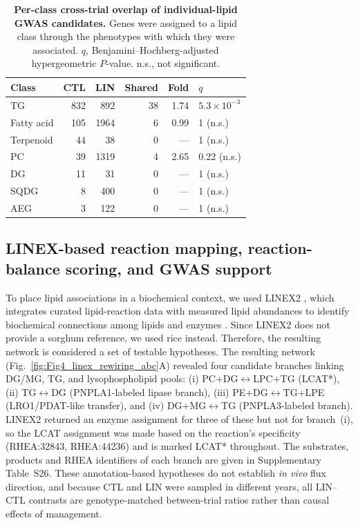 \documentclass[9pt,twocolumn,twoside]{rilabRxiv}
\begin{document}
\begin{table}[!ht]
\centering
\caption{\textbf{Per-class cross-trial overlap of individual-lipid GWAS candidates.} Genes were assigned to a lipid class through the phenotypes with which they were associated. $q$, Benjamini--Hochberg-adjusted hypergeometric $P$-value. n.s., not significant.}
\label{tab:overlap_class}
\small
\begin{tabular}{lrrrrl}
\toprule
\textbf{Class} & \textbf{CTL} & \textbf{LIN} & \textbf{Shared} & \textbf{Fold} & \textbf{$q$} \\
\midrule
TG          & 832 &  892 & 38 & 1.74 & $5.3\times10^{-3}$ \\
Fatty acid  & 105 & 1964 &  6 & 0.99 & 1 (n.s.) \\
Terpenoid   &  44 &   38 &  0 & ---  & 1 (n.s.) \\
PC          &  39 & 1319 &  4 & 2.65 & 0.22 (n.s.) \\
DG          &  11 &   31 &  0 & ---  & 1 (n.s.) \\
SQDG        &   8 &  400 &  0 & ---  & 1 (n.s.) \\
AEG         &   3 &  122 &  0 & ---  & 1 (n.s.) \\
\bottomrule
\end{tabular}
\end{table}

\subsection*{LINEX-based reaction mapping, reaction-balance scoring, and GWAS support}

To place lipid associations in a biochemical context, we used LINEX2 \citep{Rose2023LINEX2}, which integrates curated lipid-reaction data with measured lipid abundances to identify biochemical connections among lipids and enzymes \citep{Morgat2016Rhea}. Since LINEX2 does not provide a sorghum reference, we used rice instead. Therefore, the resulting network is considered a set of testable hypotheses. The resulting network (Fig.~\ref{fig:Fig4_linex_rewiring_abc}A) revealed four candidate branches linking DG/MG, TG, and lysophospholipid pools: (i) PC+DG$\leftrightarrow$LPC+TG (LCAT*), (ii) TG$\leftrightarrow$DG (PNPLA1-labeled lipase branch), (iii) PE+DG$\leftrightarrow$TG+LPE (LRO1/PDAT-like transfer), and (iv) DG+MG$\leftrightarrow$TG (PNPLA3-labeled branch). LINEX2 returned an enzyme assignment for three of these but not for branch~(i), so the LCAT assignment was made based on the reaction's specificity (RHEA:32843, RHEA:44236) and is marked LCAT* throughout. The substrates, products and RHEA identifiers of each branch are given in Supplementary Table~S26. These annotation-based hypotheses do not establish \emph{in vivo} flux direction, and because CTL and LIN were sampled in different years, all LIN--CTL contrasts are genotype-matched between-trial ratios rather than causal effects of management.
\end{document}
